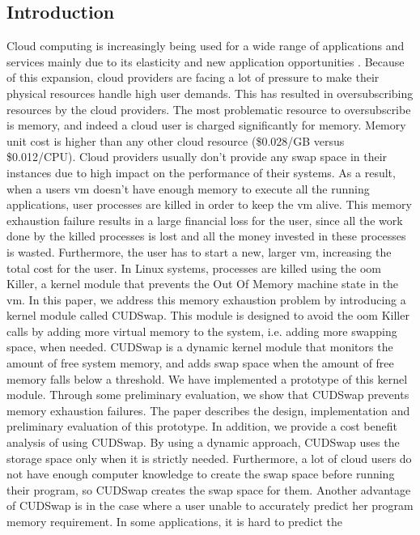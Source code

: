 \subsection{Introduction}
Cloud computing is increasingly being used for a wide range of applications and services
mainly due to its elasticity and new application opportunities \cite{Armbrust2009}. Because of this expansion,
cloud providers are facing a lot of pressure to make their physical resources handle high
user demands. This has resulted in oversubscribing resources by the cloud providers. The most
problematic resource to oversubscribe is memory, and indeed a cloud user is charged significantly
for memory. Memory unit cost is higher than any other cloud resource (\$0.028/GB versus \$0.012/CPU).
Cloud providers usually don’t provide any swap space in their instances due to high impact on
the performance of their systems. As a result, when a users \gls{vm} doesn’t have enough memory
to execute all the running applications, user processes are killed in order to keep the \gls{vm} alive.
This memory exhaustion failure results in a large financial loss for the user, since all the work done
by the killed processes is lost and all the money invested in these processes is wasted. Furthermore,
the user has to start a new, larger \gls{vm}, increasing the total cost for the user. In Linux systems,
processes are killed using the \gls{oom} Killer, a kernel module that prevents the Out Of Memory
machine state in the \gls{vm}. In this paper, we address this memory exhaustion problem by
introducing a kernel module called CUDSwap. This module is designed to avoid the \gls{oom} Killer
calls by adding more virtual memory to the system, i.e. adding more swapping space, when needed.
CUDSwap is a dynamic kernel module that monitors the amount of free system memory, and adds
swap space when the amount of free memory falls below a threshold. We have implemented a
prototype of this kernel module. Through some preliminary evaluation, we show that CUDSwap
prevents memory exhaustion failures. The paper describes the design, implementation and
preliminary evaluation of this prototype. In addition, we provide a cost benefit analysis of
using CUDSwap. By using a dynamic approach, CUDSwap uses the storage space only when it
is strictly needed. Furthermore, a lot of cloud users do not have enough computer knowledge
to create the swap space before running their program, so CUDSwap creates the swap space
for them. Another advantage of CUDSwap is in the case where a user unable to accurately
predict her program memory requirement. In some applications, it is hard to predict the
